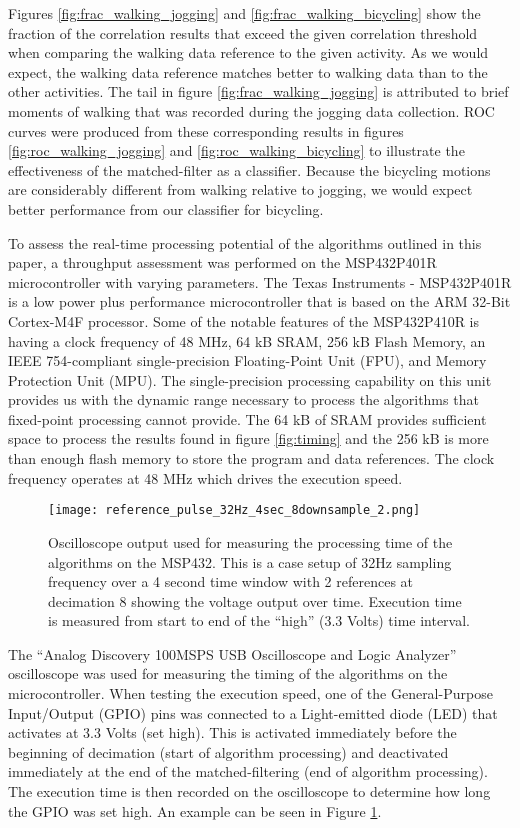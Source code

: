 \documentclass{sciposter}
\begin{document}
\begin{multicols}{3}
Figures \ref{fig:frac_walking_jogging} and \ref{fig:frac_walking_bicycling} show the fraction of the correlation results that exceed the given correlation threshold when comparing the walking data reference to the given activity.
As we would expect, the walking data reference matches better to walking data than to the other activities. The tail in figure \ref{fig:frac_walking_jogging} is attributed to brief moments of walking that was recorded during the jogging data collection.
ROC curves were produced from these corresponding results in figures \ref{fig:roc_walking_jogging} and \ref{fig:roc_walking_bicycling} to illustrate the effectiveness of the matched-filter as a classifier.
Because the bicycling motions are considerably different from walking relative to jogging, we would expect better performance from our classifier for bicycling.

To assess the real-time processing potential of the algorithms outlined in this paper, a throughput assessment was performed on the MSP432P401R microcontroller with varying parameters.
The Texas Instruments - MSP432P401R is a low power plus performance microcontroller that is based on the ARM 32-Bit Cortex-M4F processor.
Some of the notable features of the MSP432P410R is having a clock frequency of 48 MHz, 64 kB SRAM, 256 kB Flash Memory, an IEEE 754-compliant single-precision Floating-Point Unit (FPU), and Memory Protection Unit (MPU).
The single-precision processing capability on this unit provides us with the dynamic range necessary to process the algorithms that fixed-point processing cannot provide.
The 64 kB of SRAM provides sufficient space to process the results found in figure \ref{fig:timing} and
the 256 kB is more than enough flash memory to store the program and data references.
The clock frequency operates at 48 MHz which drives the execution speed.

\begin{figure}[!ht]
   \centering
   \texttt{[image: reference\_pulse\_32Hz\_4sec\_8downsample\_2.png]}
   \caption{Oscilloscope output used for measuring the processing time of the algorithms on the MSP432. This is a case setup of 32Hz sampling frequency over a 4 second time window with 2 references at decimation 8 showing the voltage output over time.
Execution time is measured from start to end of the ``high'' (3.3 Volts) time interval.}
   \label{fig:time_measure}
\end{figure}
%
The ``Analog Discovery 100MSPS USB Oscilloscope and Logic Analyzer'' oscilloscope was used for measuring the timing of the algorithms on the microcontroller.
When testing the execution speed, one of the General-Purpose Input/Output (GPIO) pins was connected to a Light-emitted diode (LED) that activates at 3.3 Volts (set high).
This is activated immediately before the beginning of decimation (start of algorithm processing) and deactivated immediately at the end of the matched-filtering (end of algorithm processing).
The execution time is then recorded on the oscilloscope to determine how long the GPIO was set high.
An example can be seen in Figure \ref{fig:time_measure}.


\end{multicols}
\end{document}
